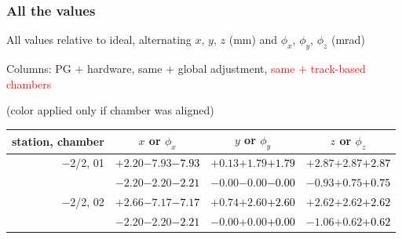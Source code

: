 \documentclass[compress]{beamer}
\begin{document}
\begin{frame}
\frametitle{All the values}
\tiny

All values relative to ideal, alternating $x$, $y$, $z$ (mm) and $\phi_x$, $\phi_y$, $\phi_z$ (mrad)

Columns: PG $+$ hardware, same $+$ global adjustment, \textcolor{red}{same $+$ track-based chambers}

\hfill (color applied only if chamber was aligned)

\vfill
\renewcommand{\arraystretch}{1.1}
\begin{tabular}{r | c | c | c}
station, chamber & $x$ or $\phi_x$ & $y$ or $\phi_y$ & $z$ or $\phi_z$ \\\hline
$-$2/2, 01 & $+2.20$\hspace{0.1 cm}$-7.93$\hspace{0.1 cm}\textcolor{black}{$-7.93$} & $+0.13$\hspace{0.1 cm}$+1.79$\hspace{0.1 cm}\textcolor{black}{$+1.79$} & $+2.87$\hspace{0.1 cm}$+2.87$\hspace{0.1 cm}\textcolor{black}{$+2.87$} \\
           & $-2.20$\hspace{0.1 cm}$-2.20$\hspace{0.1 cm}\textcolor{black}{$-2.21$} & $-0.00$\hspace{0.1 cm}$-0.00$\hspace{0.1 cm}\textcolor{black}{$-0.00$} & $-0.93$\hspace{0.1 cm}$+0.75$\hspace{0.1 cm}\textcolor{black}{$+0.75$} \\
$-$2/2, 02 & $+2.66$\hspace{0.1 cm}$-7.17$\hspace{0.1 cm}\textcolor{black}{$-7.17$} & $+0.74$\hspace{0.1 cm}$+2.60$\hspace{0.1 cm}\textcolor{black}{$+2.60$} & $+2.62$\hspace{0.1 cm}$+2.62$\hspace{0.1 cm}\textcolor{black}{$+2.62$} \\
           & $-2.20$\hspace{0.1 cm}$-2.20$\hspace{0.1 cm}\textcolor{black}{$-2.21$} & $-0.00$\hspace{0.1 cm}$+0.00$\hspace{0.1 cm}\textcolor{black}{$+0.00$} & $-1.06$\hspace{0.1 cm}$+0.62$\hspace{0.1 cm}\textcolor{black}{$+0.62$} \\

\end{tabular}
\end{frame}
\end{document}
